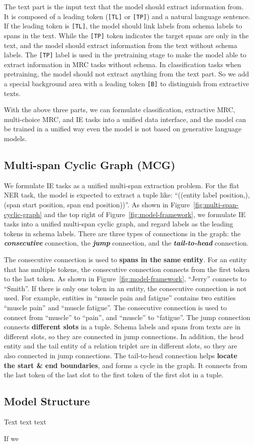 The text part is the input text that the model should extract information from.
It is composed of a leading token (\verb|[TL]| or \verb|[TP]|) and a natural language sentence.
If the leading token is \verb|[TL]|, the model should link labels from schema labels to spans in the text.
While the \verb|[TP]| token indicates the target spans are only in the text, and the model should extract information from the text without schema labels.
The \verb|[TP]| label is used in the pretraining stage to make the model able to extract information in MRC tasks without schema.
In classification tasks when pretraining, the model should not extract anything from the text part.
So we add a special background area with a leading token \verb|[B]| to distinguish from extractive texts.

With the above three parts, we can formulate classification, extractive MRC, multi-choice MRC, and IE tasks into a unified data interface, and the model can be trained in a unified way even the model is not based on generative language models.

\subsection{Multi-span Cyclic Graph (MCG)}

We formulate IE tasks as a unified multi-span extraction problem.
For the flat NER task, the model is expected to extract a tuple like: ``((entity label position,), (span start position, span end position))''.
As shown in Figure~\ref{fig:multi-span-cyclic-graph} and the top right of Figure~\ref{fig:model-framework}, we formulate IE tasks into a unified multi-span cyclic graph, and regard labels as the leading tokens in schema labels.
There are three types of connections in the graph: the \textbf{\textit{consecutive}} connection, the \textbf{\color[HTML]{695efb} \textit{jump}} connection, and the \textbf{\color[HTML]{E9087F}\textit{tail-to-head}} connection.

The consecutive connection is used to \textbf{spans in the same entity}.
For an entity that has multiple tokens, the consecutive connection connects from the first token to the last token.
As shown in Figure~\ref{fig:model-framework}, ``Jerry'' connects to ``Smith''.
If there is only one token in an entity, the consecutive connection is not used.
For example, entities in ``muscle pain and fatigue'' contains two entities ``muscle pain'' and ``muscle fatigue''.
The consecutive connection is used to connect from ``muscle'' to ``pain'', and ``muscle'' to ``fatigue''.
The jump connection connects \textbf{different slots} in a tuple.
Schema labels and spans from texts are in different slots, so they are connected in jump connections.
In addition, the head entity and the tail entity of a relation triplet are in different slots, so they are also connected in jump connections.
The tail-to-head connection helps \textbf{locate the start \& end boundaries}, and forms a cycle in the graph.
It connects from the last token of the last slot to the first token of the first slot in a tuple.

\subsection{Model Structure}

Text text text


If we 
